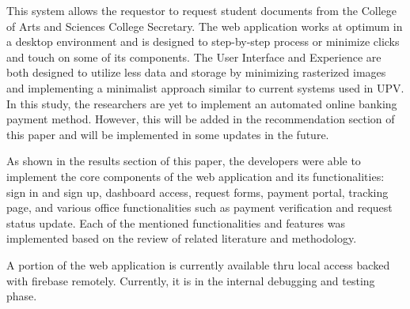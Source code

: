 This system allows the requestor to request student documents from the College of Arts and Sciences College Secretary. The web application works at optimum in a desktop environment and is designed to step-by-step process or minimize clicks and touch on some of its components. The User Interface and Experience are both designed to utilize less data and storage by minimizing rasterized images and implementing a minimalist approach similar to current systems used in UPV. In this study, the researchers are yet to implement an automated online banking payment method. However, this will be added in the recommendation section of this paper and will be implemented in some updates in the future.

As shown in the results section of this paper, the developers were able to implement the core components of the web application and its functionalities: sign in and sign up, dashboard access, request forms, payment portal, tracking page, and various office functionalities such as payment verification and request status update. Each of the mentioned functionalities and features was implemented based on the review of related literature and methodology. 

A portion of the web application is currently available thru local access backed with firebase remotely. Currently, it is in the internal debugging and testing phase.



